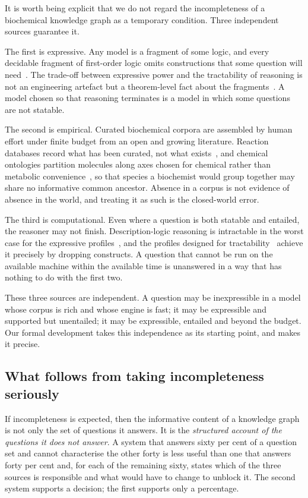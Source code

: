 \documentclass[11pt,a4paper]{article}
\theoremstyle{plain}
\theoremstyle{definition}
\theoremstyle{remark}
\begin{document}
It is worth being explicit that we do not regard the incompleteness of a
biochemical knowledge graph as a temporary condition. Three independent
sources guarantee it.

The first is expressive. Any model is a fragment of some logic, and every
decidable fragment of first-order logic omits constructions that some question
will need~\citep{BaaderCalvanese2017}. The trade-off between expressive power
and the tractability of reasoning is not an engineering artefact but a
theorem-level fact about the fragments~\citep{Donini2003,Grau2008}. A model
chosen so that reasoning terminates is a model in which some questions are not
statable.

The second is empirical. Curated biochemical corpora are assembled by human
effort under finite budget from an open and growing literature. Reaction
databases record what has been curated, not what
exists~\citep{Alcantara2012,Bansal2022}, and chemical ontologies partition
molecules along axes chosen for chemical rather than metabolic
convenience~\citep{Degtyarenko2008,Hastings2016}, so that species a biochemist
would group together may share no informative common ancestor. Absence in a
corpus is not evidence of absence in the world, and treating it as such is the
closed-world error.

The third is computational. Even where a question is both statable and
entailed, the reasoner may not finish. Description-logic reasoning is
intractable in the worst case for the expressive
profiles~\citep{Motik2009Hypertableau,Glimm2014HermiT}, and the profiles
designed for tractability~\citep{Motik2009Profiles,Kazakov2014ELK} achieve it
precisely by dropping constructs. A question that cannot be run on the
available machine within the available time is unanswered in a way that has
nothing to do with the first two.

These three sources are independent. A question may be inexpressible in a
model whose corpus is rich and whose engine is fast; it may be expressible and
supported but unentailed; it may be expressible, entailed and beyond the
budget. Our formal development takes this independence as its starting point,
and  makes it precise.

\subsection{What follows from taking incompleteness seriously}

If incompleteness is expected, then the informative content of a knowledge
graph is not only the set of questions it answers. It is the \emph{structured
account of the questions it does not answer}. A system that answers
sixty per cent of a question set and cannot characterise the other forty is
less useful than one that answers forty per cent and, for each of the
remaining sixty, states which of the three sources is responsible and what
would have to change to unblock it. The second system supports a decision; the
first supports only a percentage.
\end{document}
